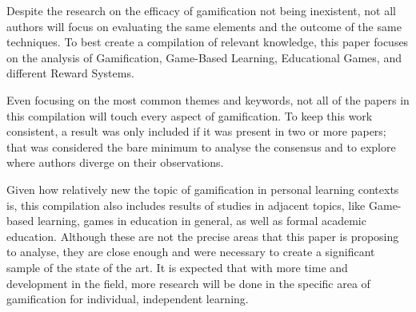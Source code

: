 Despite the research on the efficacy of gamification not being inexistent, not all authors will focus on evaluating the same elements and the outcome of the same techniques. To best create a compilation of relevant knowledge, this paper focuses on the analysis of Gamification, Game-Based Learning, Educational Games, and different Reward Systems.

Even focusing on the most common themes and keywords, not all of the papers in this compilation will touch every aspect of gamification. To keep this work consistent, a result was only included if it was present in two or more papers; that was considered the bare minimum to analyse the consensus and to explore where authors diverge on their observations.

Given how relatively new the topic of gamification in personal learning contexts is, this compilation also includes results of studies in adjacent topics, like Game-based learning, games in education in general, as well as formal academic education. Although these are not the precise areas that this paper is proposing to analyse, they are close enough and were necessary to create a significant sample of the state of the art. It is expected that with more time and development in the field, more research will be done in the specific area of gamification for individual, independent learning.